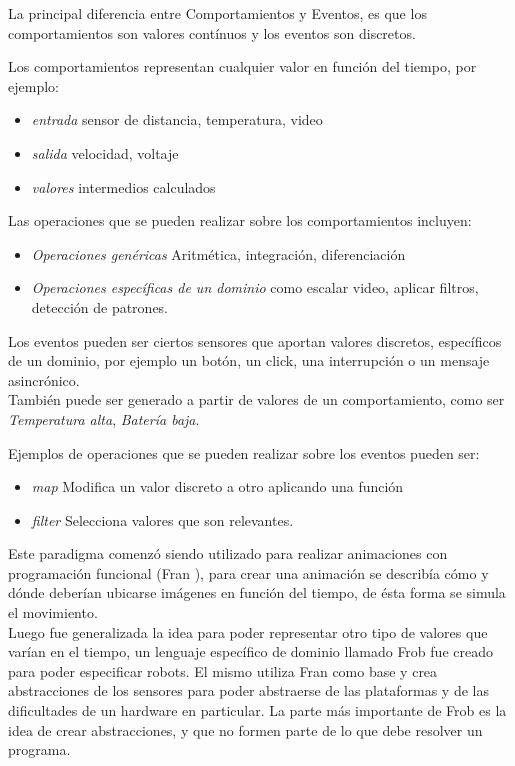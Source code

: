 La principal diferencia entre Comportamientos y Eventos, es que los
comportamientos son valores contínuos y los eventos son discretos.

Los comportamientos representan cualquier valor en función del tiempo,
por ejemplo:
\begin{itemize}
\item \textit{entrada} sensor de distancia, temperatura, video
\item \textit{salida} velocidad, voltaje
\item \textit{valores} intermedios calculados
\end{itemize}

Las operaciones que se pueden realizar sobre los comportamientos incluyen:

\begin{itemize}
\item \textit{Operaciones genéricas} Aritmética, integración, diferenciación
\item \textit{Operaciones específicas de un dominio} como escalar video, aplicar filtros, detección de patrones.
\end{itemize}

Los eventos pueden ser ciertos sensores que aportan valores discretos,
específicos de un dominio, por ejemplo un
botón, un click, una interrupción o un mensaje asincrónico.\\
También puede ser generado a partir de valores de un comportamiento,
como ser \emph{Temperatura alta}, \emph{Batería baja}.

Ejemplos de operaciones que se pueden realizar sobre los eventos pueden ser:

\begin{itemize}
\item \textit{map} Modifica un valor discreto a otro aplicando una función
\item \textit{filter} Selecciona valores que son relevantes.
\end{itemize}



  Este paradigma comenzó siendo utilizado para realizar animaciones con programación
funcional (Fran \cite{ElliottHudak97:Fran}), para crear una animación se describía
cómo y dónde deberían ubicarse imágenes en función del tiempo, de ésta forma se simula
el movimiento.\\
  Luego fue generalizada la idea para poder representar otro tipo de valores que
varían en el tiempo, un lenguaje específico de dominio llamado
Frob \cite{petersonhudakelliot99:lambdainmotion} fue creado para poder especificar
robots. El mismo utiliza Fran como base y crea abstracciones de los sensores
para poder abstraerse de las plataformas y de las dificultades de un hardware en particular.
  La parte más importante de Frob es la idea de crear abstracciones, y que no formen
parte de lo que debe resolver un programa.

